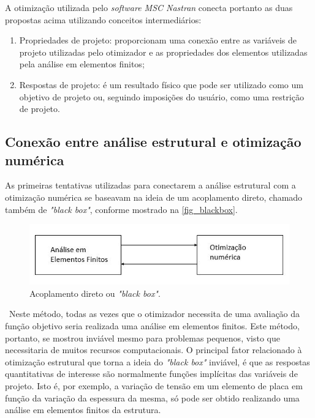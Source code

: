 A otimização utilizada pelo \emph{software MSC Nastran} conecta portanto as duas propostas acima utilizando conceitos intermediários:
\begin{enumerate}
\item Propriedades de projeto: proporcionam uma conexão entre as variáveis de projeto utilizadas pelo otimizador e as propriedades dos elementos utilizadas pela análise em elementos finitos;
\item Respostas de projeto: é um resultado físico que pode ser utilizado como um objetivo de projeto ou, seguindo imposições do usuário, como uma restrição de projeto.
\end{enumerate}

\subsection{Conexão entre análise estrutural e otimização numérica}
As primeiras tentativas utilizadas para conectarem a análise estrutural com a otimização numérica se baseavam na ideia de um acoplamento direto, chamado também de \emph{"black box"}, conforme mostrado na \autoref{fig_blackbox}.

\begin{figure}[h]
	\caption{\label{fig_blackbox}Acoplamento direto ou \emph{"black box"}.}
  \centering
  \includegraphics[scale=0.7]{figura/blackbox}
\end{figure}

\
Neste método, todas as vezes que o otimizador necessita de uma avaliação da função objetivo seria realizada uma análise em elementos finitos. Este método, portanto, se mostrou inviável mesmo para problemas pequenos, visto que necessitaria de muitos recursos computacionais. O principal fator relacionado à otimização estrutural que torna a ideia do \emph{"black box"} inviável, é que as respostas quantitativas de interesse são normalmente funções implícitas das variáveis de projeto. Isto é, por exemplo, a variação de tensão em um elemento de placa em função da variação da espessura da mesma, só pode ser obtido realizando uma análise em elementos finitos da estrutura.

